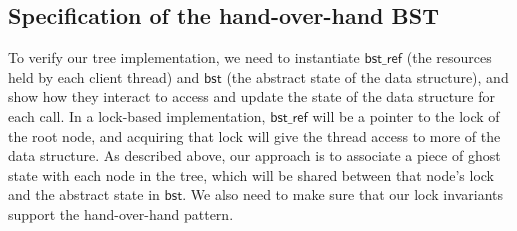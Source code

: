 \documentclass[a4paper,USenglish,cleveref, autoref, thm-restate]{lipics-v2021}
\newcommand{\treerep}{\ensuremath{\mathsf{bst}}}
\newcommand{\nodeboxrep}{\ensuremath{\mathsf{bst\_ref}}}
\begin{document}
\subsection{Specification of the hand-over-hand BST}

To verify our tree implementation, we need to instantiate $\nodeboxrep$ (the resources held by each client thread) and $\treerep$ (the abstract state of the data structure), and show how they interact to access and update the state of the data structure for each call. In a lock-based implementation, $\nodeboxrep$ will be a pointer to the lock of the root node, and acquiring that lock will give the thread access to more of the data structure. As described above, our approach is to associate a piece of ghost state with each node in the tree, which will be shared between that node's lock and the abstract state in $\treerep$. We also need to make sure that our lock invariants support the hand-over-hand pattern.
\end{document}
